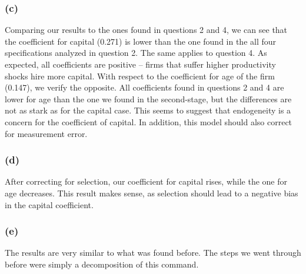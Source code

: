 \documentclass[11pt]{article}
\begin{document}
\subsubsection*{(c)}

\FloatBarrier
Comparing our results to the ones found in questions 2 and 4, we can see that the coefficient for capital (0.271) is lower than the one found in the all four specifications analyzed in question 2. The same applies to question 4. As expected, all coefficients are positive -- firms that suffer higher productivity shocks hire more capital. 
With respect to the coefficient for age of the firm (0.147), we verify the opposite. All coefficients found in questions 2 and 4 are lower for age than the one we found in the second-stage, but the differences are not as stark as for the capital case. 
This seems to suggest that endogeneity is a concern for the coefficient of capital. In addition, this model should also correct for measurement error.  
\newpage
\subsubsection*{(d)}

\FloatBarrier
After correcting for selection, our coefficient for capital rises, while the one for age decreases. 
This result makes sense, as selection should lead to a negative bias in the capital coefficient. 
\subsubsection*{(e)}

\FloatBarrier
The results are very similar to what was found before. The steps we went through before were simply a decomposition of this command.  
\end{document}
